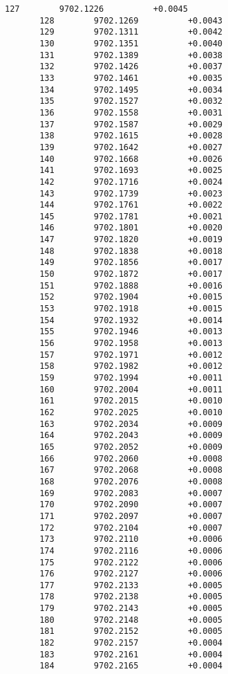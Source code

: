 \documentclass[11pt]{article}
\begin{document}
\begin{Verbatim}[commandchars=\\\{\}]
       127        9702.1226          +0.0045
       128        9702.1269          +0.0043
       129        9702.1311          +0.0042
       130        9702.1351          +0.0040
       131        9702.1389          +0.0038
       132        9702.1426          +0.0037
       133        9702.1461          +0.0035
       134        9702.1495          +0.0034
       135        9702.1527          +0.0032
       136        9702.1558          +0.0031
       137        9702.1587          +0.0029
       138        9702.1615          +0.0028
       139        9702.1642          +0.0027
       140        9702.1668          +0.0026
       141        9702.1693          +0.0025
       142        9702.1716          +0.0024
       143        9702.1739          +0.0023
       144        9702.1761          +0.0022
       145        9702.1781          +0.0021
       146        9702.1801          +0.0020
       147        9702.1820          +0.0019
       148        9702.1838          +0.0018
       149        9702.1856          +0.0017
       150        9702.1872          +0.0017
       151        9702.1888          +0.0016
       152        9702.1904          +0.0015
       153        9702.1918          +0.0015
       154        9702.1932          +0.0014
       155        9702.1946          +0.0013
       156        9702.1958          +0.0013
       157        9702.1971          +0.0012
       158        9702.1982          +0.0012
       159        9702.1994          +0.0011
       160        9702.2004          +0.0011
       161        9702.2015          +0.0010
       162        9702.2025          +0.0010
       163        9702.2034          +0.0009
       164        9702.2043          +0.0009
       165        9702.2052          +0.0009
       166        9702.2060          +0.0008
       167        9702.2068          +0.0008
       168        9702.2076          +0.0008
       169        9702.2083          +0.0007
       170        9702.2090          +0.0007
       171        9702.2097          +0.0007
       172        9702.2104          +0.0007
       173        9702.2110          +0.0006
       174        9702.2116          +0.0006
       175        9702.2122          +0.0006
       176        9702.2127          +0.0006
       177        9702.2133          +0.0005
       178        9702.2138          +0.0005
       179        9702.2143          +0.0005
       180        9702.2148          +0.0005
       181        9702.2152          +0.0005
       182        9702.2157          +0.0004
       183        9702.2161          +0.0004
       184        9702.2165          +0.0004

\end{Verbatim}
\end{document}
